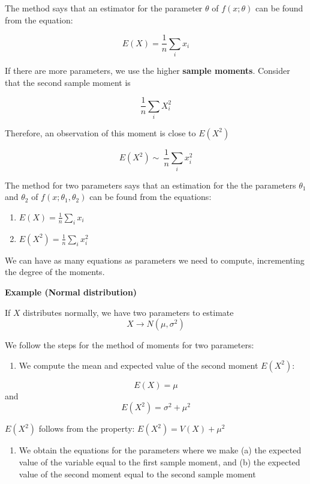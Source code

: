 \documentclass[
]{book}
\providecommand{\tightlist}{%
  \setlength{\itemsep}{0pt}\setlength{\parskip}{0pt}}
\begin{document}
The method says that an estimator for the parameter \(\theta\) of \(f(x;\theta)\) can be found from the equation:

\[E(X)=\frac{1}{n}\sum_i x_i\]

If there are more parameters, we use the higher \textbf{sample moments}. Consider that the second sample moment is

\[\frac{1}{n}\sum_i X^2_i\]

Therefore, an observation of this moment is close to \(E(X^2)\)

\[E(X ^ 2)\sim~\frac{1}{n}\sum_i x^2_i\]

The method for two parameters says that an estimation for the the parameters \(\theta_1\) and \(\theta_2\) of \(f(x;\theta_1,\theta_2)\) can be found from the equations:

\begin{enumerate}
\def\labelenumi{\alph{enumi}.}
\item
  \(E(X)= \frac{1}{n}\sum_i x_i\)
\item
  \(E(X^2)=\frac{1}{n}\sum_i x^2_i\)
\end{enumerate}

We can have as many equations as parameters we need to compute, incrementing the degree of the moments.

\textbf{Example (Normal distribution)}

If \(X\) distributes normally, we have two parameters to estimate
\[X \rightarrow N(\mu, \sigma^2)\]

We follow the steps for the method of moments for two parameters:

\begin{enumerate}
\def\labelenumi{\arabic{enumi}.}
\tightlist
\item
  We compute the mean and expected value of the second moment \(E(X^2)\):
\end{enumerate}

\[E(X)=\mu\]
and
\[E(X^2)=\sigma^2+\mu^2\]

\(E(X^2)\) follows from the property: \(E(X^2) = V(X)+\mu^2\)

\begin{enumerate}
\def\labelenumi{\arabic{enumi}.}
\setcounter{enumi}{1}
\tightlist
\item
  We obtain the equations for the parameters where we make (a) the expected value of the variable equal to the first sample moment, and (b) the expected value of the second moment equal to the second sample moment
\end{enumerate}
\end{document}

